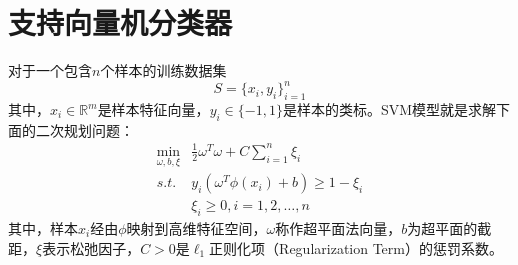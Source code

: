 \section{支持向量机分类器}
对于一个包含$n$个样本的训练数据集\[S=\{x_i,y_i\}_{i=1}^n\]其中，$x_i\in \mathbb{R}^m$是样本特征向量，$y_i\in\{-1,1\}$是样本的类标。SVM模型就是求解下面的二次规划问题：
\begin{equation}\label{eq:svm}
    \begin{array}{ll}
      \min\limits_{\omega,b,\xi} & \frac{1}{2}\omega^T\omega + C\sum\limits_{i=1}^n\xi_i\\
      \textit{s.t.} & y_i(\omega^T\phi(x_i) + b) \ge 1 - \xi_i \\
      & \xi_i \ge 0 ,i = 1,2,\ldots,n
    \end{array}
\end{equation}
其中，样本$x_i$经由$\phi$映射到高维特征空间，$\omega$称作超平面法向量，$b$为超平面的截距，$\xi$表示松弛因子，$C >0$是$\ell_1$正则化项（Regularization Term）的惩罚系数。

